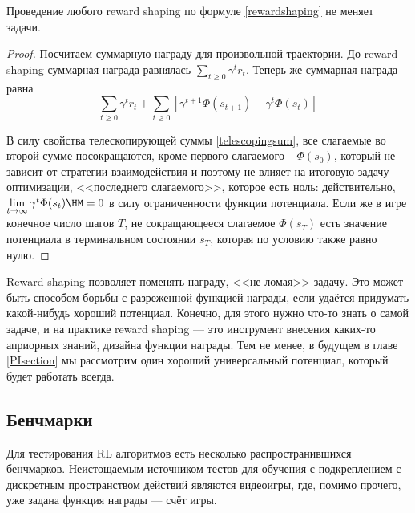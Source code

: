 \begin{theorem}
Проведение любого reward shaping по формуле \eqref{rewardshaping} не меняет задачи.

\begin{proof} Посчитаем суммарную награду для произвольной траектории. До reward shaping суммарная награда равнялась $\sum\limits_{t \ge 0} \gamma^t r_t$. Теперь же суммарная награда равна
\begin{equation*}
\sum_{t \ge 0} \gamma^t r_t + \sum_{t \ge 0} \left[ \gamma^{t+1} \Phi(s_{t+1}) - \gamma^{t} \Phi(s_t) \right]
\end{equation*}

В силу свойства телескопирующей суммы \eqref{telescopingsum}, все слагаемые во второй сумме посокращаются, кроме первого слагаемого $-\Phi(s_0)$, который не зависит от стратегии взаимодействия и поэтому не влияет на итоговую задачу оптимизации, <<последнего слагаемого>>, которое есть ноль: действительно, $\lim\limits_{t \to \infty} \gamma^{t} \Phi(s_t) \HM= 0$ в силу ограниченности функции потенциала. Если же в игре конечное число шагов $T$, не сокращающееся слагаемое $\Phi(s_T)$ есть значение потенциала в терминальном состоянии $s_T$, которая по условию также равно нулю.
\end{proof}
\end{theorem}

Reward shaping позволяет поменять награду, <<не ломая>> задачу. Это может быть способом борьбы с разреженной функцией награды, если удаётся придумать какой-нибудь хороший потенциал. Конечно, для этого нужно что-то знать о самой задаче, и на практике reward shaping --- это инструмент внесения каких-то априорных знаний, дизайна функции награды. Тем не менее, в будущем в главе \ref{PIsection} мы рассмотрим один хороший универсальный потенциал, который будет работать всегда.

\subsection{Бенчмарки}

Для тестирования RL алгоритмов есть несколько распространившихся бенчмарков. Неистощаемым источником тестов для обучения с подкреплением с дискретным пространством действий являются видеоигры, где, помимо прочего, уже задана функция награды --- счёт игры.

